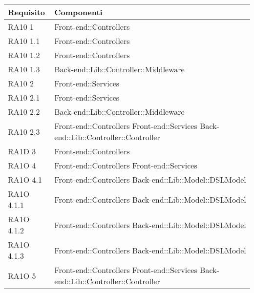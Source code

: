       \begin{center}
      \bgroup
      \def\arraystretch{1.8}
      \begin{longtable}{|p{3cm}|p{7cm}|}
    
      \cellcolor[gray]{0.9} \textbf{Requisito} & \cellcolor[gray]{0.9} \textbf{Componenti}  \\ \hline
      
      RA10 1 & Front-end::Controllers \\ \hline
      RA10 1.1 & Front-end::Controllers \\ \hline
      RA10 1.2 & Front-end::Controllers \\ \hline
      RA10 1.3 & Back-end::Lib::Controller::Middleware \\ \hline
      RA10 2 & Front-end::Services \\ \hline
      RA10 2.1 & Front-end::Services \\ \hline
      RA10 2.2 & Back-end::Lib::Controller::Middleware \\ \hline
      RA10 2.3 & Front-end::Controllers \newline
      			Front-end::Services \newline
      			Back-end::Lib::Controller::Controller\\ \hline
      RA1D 3 & Front-end::Controllers \\ \hline
      RA1O 4 & Front-end::Controllers \newline
      			Front-end::Services \\ \hline
      RA1O 4.1 & Front-end::Controllers \newline
      			Back-end::Lib::Model::DSLModel \\ \hline
      RA1O 4.1.1 & Front-end::Controllers \newline
      			Back-end::Lib::Model::DSLModel \\ \newline
      RA1O 4.1.2 & Front-end::Controllers \newline
      			Back-end::Lib::Model::DSLModel \\ \hline
      RA1O 4.1.3 & Front-end::Controllers \newline
      				Back-end::Lib::Model::DSLModel \\ \hline
      RA1O 5 & Front-end::Controllers \newline
      			Front-end::Services \newline
      			Back-end::Lib::Controller::Controller\newline

\end{longtable}
\end{center}
